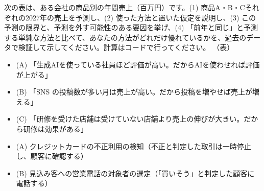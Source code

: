 
\begin{promptbox}[予測と前提の説明]
次の表は、ある会社の商品別の年間売上（百万円）です。(1) 商品A・B・Cそれぞれの2027年の売上を予測し、(2) 使った方法と置いた仮定を説明し、(3) この予測の限界と、予測を外す可能性のある要因を挙げ、(4) 「前年と同じ」と予測する単純な方法と比べて、あなたの方法がどれだけ優れているかを、過去のデータで検証して示してください。計算はコードで行ってください。
（表）
\end{promptbox}

\begin{itemize}
  \item (A) 「生成AIを使っている社員ほど評価が高い。だからAIを使わせれば評価が上がる」
  \item (B) 「SNS の投稿数が多い月は売上が高い。だから投稿を増やせば売上が増える」
  \item (C) 「研修を受けた店舗は受けていない店舗より売上の伸びが大きい。だから研修は効果がある」
\end{itemize}

\begin{itemize}
  \item (A) クレジットカードの不正利用の検知（不正と判定した取引は一時停止し、顧客に確認する）
  \item (B) 見込み客への営業電話の対象者の選定（「買いそう」と判定した顧客に電話する）
\end{itemize}



